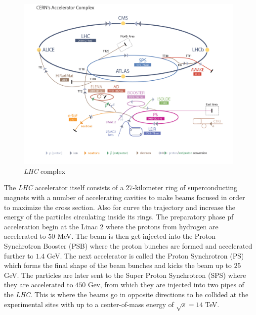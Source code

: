 \begin{figure}[htpb]
 \centering
 \includegraphics[scale=0.18]{figures/lhc2.png}
 \caption{\textit{LHC} complex}
 \label{}
\end{figure}

The \textit{LHC} accelerator itself consists of a $27$-kilometer ring of
superconducting magnets with a number of accelerating cavities to make
beams focused in order to maximize the cross section. Also for curve the
trajectory and increase the energy of the particles circulating inside its
rings. The preparatory phase pf acceleration begin at the Linac 2 where the
protons from hydrogen are accelerated to $50$ MeV. The beam is then get
injected into the Proton Synchrotron Booster (PSB) where the proton bunches
are formed and accelerated further to $1.4$ GeV. The next accelerator is
called the Proton Synchrotron (PS) which forms the final shape of the beam
bunches and kicks the beam up to $25$ GeV. The particles are later sent to
the Super Proton Synchrotron (SPS) where they are accelerated to $450$ Gev,
from which they are injected into two pipes of the \textit{LHC}. This is
where the beams go in opposite directions to be collided at the
experimental sites with up to a center-of-mass energy of $\sqrt{s}=14$ TeV.

